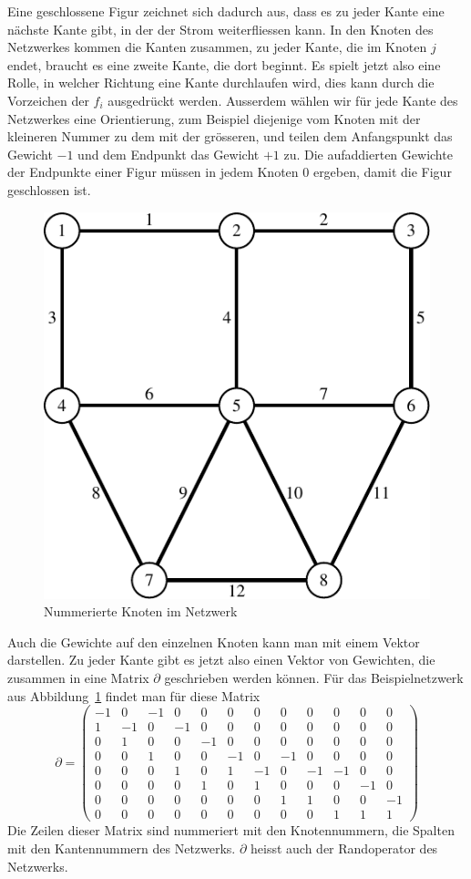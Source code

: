 Eine geschlossene Figur zeichnet sich dadurch aus, dass es zu
jeder Kante eine nächste Kante gibt, in der der Strom weiterfliessen
kann. In den Knoten des Netzwerkes kommen die Kanten zusammen,
zu jeder Kante, die im Knoten $j$ endet, braucht es eine zweite
Kante, die dort beginnt.
Es spielt jetzt also eine Rolle, in welcher Richtung eine
Kante durchlaufen wird, dies kann durch die Vorzeichen der $f_i$
ausgedrückt werden. Ausserdem wählen wir für jede Kante
des Netzwerkes eine Orientierung, zum Beispiel diejenige vom
Knoten mit der kleineren Nummer zu dem mit der grösseren,
und teilen dem Anfangspunkt
das Gewicht $-1$ und dem Endpunkt das Gewicht $+1$ zu. Die
aufaddierten Gewichte der Endpunkte einer Figur müssen in jedem
Knoten $0$ ergeben, damit die Figur geschlossen ist.
\begin{figure}
\begin{center}
\includegraphics[width=0.6\hsize]{images/kirchhoff-2}
\end{center}
\caption{Nummerierte Knoten im Netzwerk\label{netzwerk-numeriert}}
\end{figure}
Auch die Gewichte auf den einzelnen Knoten kann man mit einem
Vektor darstellen. Zu jeder Kante gibt es jetzt also einen
Vektor von Gewichten, die zusammen in eine Matrix $\partial$
geschrieben werden können.
Für das Beispielnetzwerk aus Abbildung~\ref{netzwerk-numeriert}
findet man für diese Matrix
\setcounter{MaxMatrixCols}{12}
\[
\partial=\begin{pmatrix}
-1& 0&-1& 0& 0& 0& 0& 0& 0& 0& 0& 0\\
 1&-1& 0&-1& 0& 0& 0& 0& 0& 0& 0& 0\\
 0& 1& 0& 0&-1& 0& 0& 0& 0& 0& 0& 0\\
 0& 0& 1& 0& 0&-1& 0&-1& 0& 0& 0& 0\\
 0& 0& 0& 1& 0& 1&-1& 0&-1&-1& 0& 0\\
 0& 0& 0& 0& 1& 0& 1& 0& 0& 0&-1& 0\\
 0& 0& 0& 0& 0& 0& 0& 1& 1& 0& 0&-1\\
 0& 0& 0& 0& 0& 0& 0& 0& 0& 1& 1& 1
\end{pmatrix}
\]
Die Zeilen dieser Matrix sind nummeriert mit den Knotennummern,
die Spalten mit den Kantennummern des Netzwerks. $\partial$
heisst auch der Randoperator des Netzwerks.

